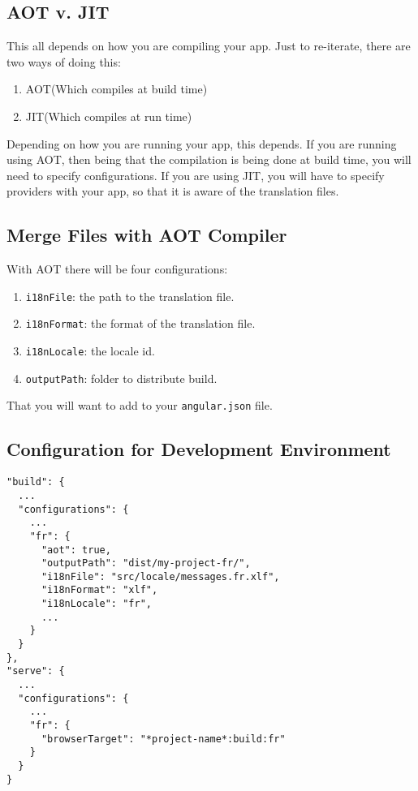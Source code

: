 \subsection{AOT v. JIT}
This all depends on how you are compiling your app. Just to re-iterate, there
are two ways of doing this:
\begin{enumerate}
  \item AOT(Which compiles at build time)
  \item JIT(Which compiles at run time)
\end{enumerate}

Depending on how you are running your app, this depends. If you are running 
using AOT, then being that the compilation is being done at build time, you 
will need to specify configurations. If you are using JIT, you will have to 
specify providers with your app, so that it is aware of the translation 
files.

\subsection{Merge Files with AOT Compiler}
With AOT there will be four configurations: 
\begin{enumerate}
  \item \lstinline{i18nFile}: the path to the translation file.
  \item \lstinline{i18nFormat}: the format of the translation file.
  \item \lstinline{i18nLocale}: the locale id.
  \item \lstinline{outputPath}: folder to distribute build.
\end{enumerate}

That you will want to add to your \lstinline{angular.json} file.

\subsection{Configuration for Development Environment}

\begin{lstlisting}[caption=angular.json]
"build": {
  ...
  "configurations": {
    ...
    "fr": {
      "aot": true,
      "outputPath": "dist/my-project-fr/",
      "i18nFile": "src/locale/messages.fr.xlf",
      "i18nFormat": "xlf",
      "i18nLocale": "fr",
      ...
    }
  }
},
"serve": {
  ...
  "configurations": {
    ...
    "fr": {
      "browserTarget": "*project-name*:build:fr"
    }
  }
}  
\end{lstlisting}

